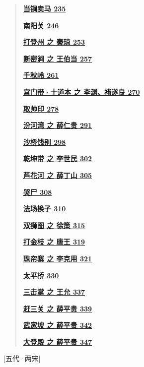 \begin{quote}
\href{/l}{\textbf{当锏卖马 235}}

\href{/l}{\textbf{南阳关 246}}

\href{/l}{\textbf{打登州 之 秦琼 253}}

\href{/l}{\textbf{断密涧 之 王伯当 257}}

\href{/l}{\textbf{千秋岭 261}}

\href{/l}{\textbf{宫门带·十道本 之 李渊、褚遂良 270}}

\href{/l}{\textbf{取帅印 278}}

\href{/l}{\textbf{汾河湾 之 薛仁贵 291}}

\href{/l}{\textbf{沙桥饯别 298}}

\href{/l}{\textbf{乾坤带 之 李世民 302}}

\href{/l}{\textbf{芦花河 之 薛丁山 305}}

\href{/l}{\textbf{哭尸 308}}

\href{/l}{\textbf{法场换子 310}}

\href{/l}{\textbf{双狮图 之 徐策 315}}

\href{/l}{\textbf{打金枝 之 唐王 319}}

\href{/l}{\textbf{珠帘寨 之 李克用 321}}

\href{/l}{\textbf{太平桥 330}}

\href{/l}{\textbf{三击掌 之 王允 337}}

\href{/l}{\textbf{赶三关 之 薛平贵 339}}

\href{/l}{\textbf{武家坡 之 薛平贵 342}}

\href{/l}{\textbf{大登殿 之 薛平贵 347}}
\end{quote}

{[}五代·两宋{]}

